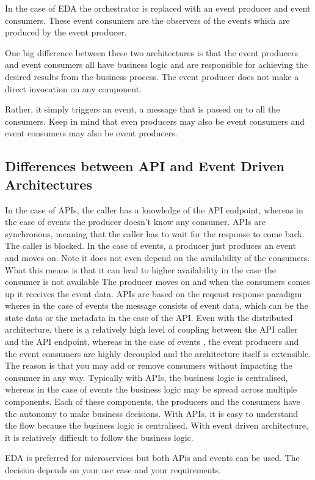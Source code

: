 In the case of EDA the orchestrator is replaced with an event producer and event consumers.
These event consumers are the observers of the events which are produced by the event producer.

One big difference between these two architectures is that the event producers and event consumers all have business logic and are responsible for achieving the desired results from the business process.
The event producer does not make a direct invocation on any component.

Rather, it simply triggers an event, a message that is passed on to all the consumers.
Keep in mind that even producers may also be event consumers and event consumers may also be event producers.

\subsection{Differences between API and Event Driven Architectures}
In the case of APIs, the caller has a knowledge of the API endpoint, whereas in the case of events the producer doesn't know any consumer.
APIs are synchronous, meaning that the caller has to wait for the response to come back. The caller is blocked.
In the case of events, a producer just produces an event and moves on. Note it does not even depend on the availability of the consumers.
What this means is that it can lead to higher availability in the case the consumer is not available
The producer moves on and when the consumers comes up it receives the event data.
APIs are based on the reqeust response paradigm wheres in the case of events the message consists of event data, which can be the state data or the metadata in the case of the API.
Even with the distributed architecture, there is a relatively high level of coupling between the API caller and the API endpoint, whereas in the case of events
, the event producers and the event consumers are highly decoupled and the architecture itself is extensible.
The reason is that you may add or remove consumers without impacting the consumer in any way.
Typically with APIs, the business logic is centralised, whereas in the case of events the business logic may be spread across multiple components.
Each of these components, the producers and the consumers have the autonomy to make business decisions.
With APIs, it is easy to understand the flow because the business logic is centralised.
With event driven architecture, it is relatively difficult to follow the business logic.

EDA is preferred for microservices but both APis and events can be used.
The decision depends on your use case and your requirements.

